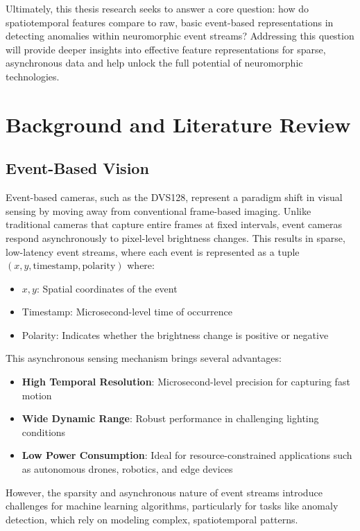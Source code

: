 \documentclass[12pt,a4paper]{article}
\begin{document}
Ultimately, this thesis research seeks to answer a core question: how do spatiotemporal features compare to raw, basic event-based representations in detecting anomalies within neuromorphic event streams? Addressing this question will provide deeper insights into effective feature representations for sparse, asynchronous data and help unlock the full potential of neuromorphic technologies.

\section{Background and Literature Review}

\subsection{Event-Based Vision}

Event-based cameras, such as the DVS128, represent a paradigm shift in visual sensing by moving away from conventional frame-based imaging. Unlike traditional cameras that capture entire frames at fixed intervals, event cameras respond asynchronously to pixel-level brightness changes. This results in sparse, low-latency event streams, where each event is represented as a tuple $(x, y, \text{timestamp}, \text{polarity})$ where:

\begin{itemize}
    \item $x, y$: Spatial coordinates of the event
    \item Timestamp: Microsecond-level time of occurrence
    \item Polarity: Indicates whether the brightness change is positive or negative
\end{itemize}

This asynchronous sensing mechanism brings several advantages:

\begin{itemize}
    \item \textbf{High Temporal Resolution}: Microsecond-level precision for capturing fast motion
    \item \textbf{Wide Dynamic Range}: Robust performance in challenging lighting conditions
    \item \textbf{Low Power Consumption}: Ideal for resource-constrained applications such as autonomous drones, robotics, and edge devices
\end{itemize}

However, the sparsity and asynchronous nature of event streams introduce challenges for machine learning algorithms, particularly for tasks like anomaly detection, which rely on modeling complex, spatiotemporal patterns.
\end{document}
